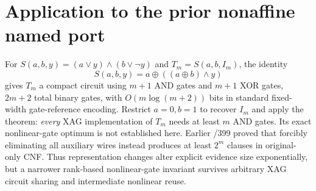 \documentclass[11pt]{article}
\begin{document}
\section*{Application to the prior nonaffine named port}
For $S(a,b,y)=(a\lor y)\land(b\lor\neg y)$ and $T_m=S(a,b,I_m)$, the identity
$$S(a,b,y)=a\oplus((a\oplus b)\wedge y)$$
gives $T_m$ a compact circuit using $m+1$ AND gates and $m+1$ XOR gates, $2m+2$ total binary gates, with $O(m\log(m+2))$ bits in standard fixed-width gate-reference encoding. Restrict $a=0,b=1$ to recover $I_m$ and apply the theorem: \emph{every} XAG implementation of $T_m$ needs at least $m$ AND gates. Its exact nonlinear-gate optimum is not established here. Earlier /399 proved that forcibly eliminating all auxiliary wires instead produces at least $2^m$ clauses in original-only CNF. Thus representation changes alter explicit evidence size exponentially, but a narrower rank-based nonlinear-gate invariant survives arbitrary XAG circuit sharing and intermediate nonlinear reuse.
\end{document}
